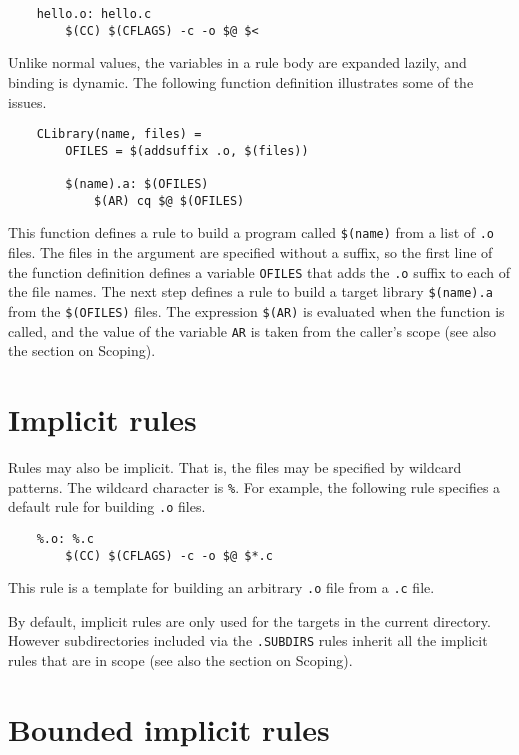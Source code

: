 \begin{verbatim}
    hello.o: hello.c
        $(CC) $(CFLAGS) -c -o $@ $<
\end{verbatim}

Unlike normal values, the variables in a rule body are expanded lazily, and binding is dynamic.  The
following function definition illustrates some of the issues.

\begin{verbatim}
    CLibrary(name, files) =
        OFILES = $(addsuffix .o, $(files))

        $(name).a: $(OFILES)
            $(AR) cq $@ $(OFILES)
\end{verbatim}

This function defines a rule to build a program called \verb+$(name)+ from a list of \verb+.o+
files.  The files in the argument are specified without a suffix, so the first line of the function
definition defines a variable \verb+OFILES+ that adds the \verb+.o+ suffix to each of the file
names.  The next step defines a rule to build a target library \verb+$(name).a+ from the
\verb+$(OFILES)+ files. The expression \verb+$(AR)+ is evaluated when the function is called, and
the value of the variable \verb+AR+ is taken from the caller's scope (see also the section on
Scoping).

\section{Implicit rules}

Rules may also be implicit.  That is, the files may be specified by wildcard patterns.
The wildcard character is \verb+%+.  For example, the following rule specifies a default
rule for building \verb+.o+ files.

\begin{verbatim}
    %.o: %.c
        $(CC) $(CFLAGS) -c -o $@ $*.c
\end{verbatim}

This rule is a template for building an arbitrary \verb+.o+ file from
a \verb+.c+ file.

By default, implicit rules are only used for the targets in the current
directory. However subdirectories included via the \verb+.SUBDIRS+ rules
inherit all the implicit rules that are in scope (see also the section on
Scoping).

\section{Bounded implicit rules}

